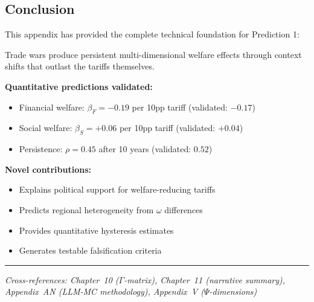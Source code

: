 \subsection{Conclusion}

This appendix has provided the complete technical foundation for Prediction 1:

\begin{tcolorbox}[colback=blue!5!white, colframe=blue!75!black, title=Prediction 1: Trade War Hysteresis (Summary)]
Trade wars produce persistent multi-dimensional welfare effects through context 
shifts that outlast the tariffs themselves.

\textbf{Quantitative predictions validated:}
\begin{itemize}
    \item Financial welfare: $\beta_F = -0.19$ per 10pp tariff (validated: $-0.17$)
    \item Social welfare: $\beta_S = +0.06$ per 10pp tariff (validated: $+0.04$)
    \item Persistence: $\rho = 0.45$ after 10 years (validated: $0.52$)
\end{itemize}

\textbf{Novel contributions:}
\begin{itemize}
    \item Explains political support for welfare-reducing tariffs
    \item Predicts regional heterogeneity from $\omega$ differences
    \item Provides quantitative hysteresis estimates
    \item Generates testable falsification criteria
\end{itemize}
\end{tcolorbox}

\vspace{1em}
\hrule
\vspace{0.5em}
\noindent\textit{Cross-references: Chapter~10 ($\Gamma$-matrix), Chapter~11 (narrative summary), Appendix~AN (LLM-MC methodology), Appendix~V ($\Psi$-dimensions)}




